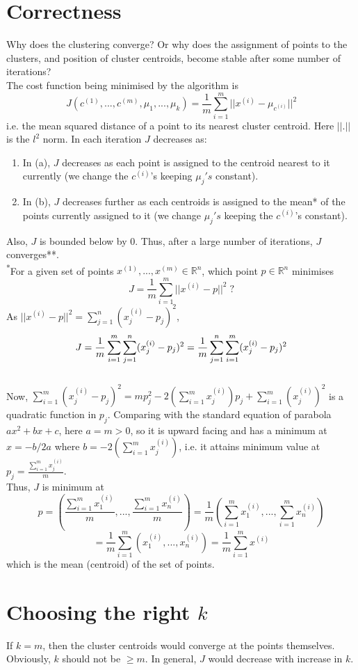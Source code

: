\documentclass{article}
\begin{document}
\section{Correctness}
Why does the clustering converge? Or why does the assignment of points to the clusters, and position of cluster centroids, become stable after some number of iterations?
\\
The cost function being minimised by the algorithm is
\[J(c^{(1)},...,c^{(m)},\mu_1,...,\mu_k) = 
\frac{1}{m}\sum_{i=1}^{m}|| x^{(i)}-\mu_{c^{(i)}}||^2\]
i.e. the mean squared distance of a point to its nearest cluster centroid. Here \(||.||\) is the \(l^2\) norm.
In each iteration \(J\) decreases as:
\begin{enumerate}
\item In (a), \(J\) decreases as each point is assigned to the centroid nearest to it currently (we change the \(c^{(i)}\)'s keeping \(\mu_j's\) constant).
\item In (b), \(J\) decreases further as each centroids is assigned to the mean* of the points currently assigned to it (we change \(\mu_j's\) keeping the \(c^{(i)}\)'s constant).
\end{enumerate}
Also, \(J\) is bounded below by 0. Thus, after a large number of iterations, \(J\) converges**.
\\
\textsuperscript{*}For a given set of points \(x^{(1)},...,x^{(m)} \in \mathbb{R}^n\), which point \(p\in\mathbb{R}^n\) minimises
\[J = \frac{1}{m}\sum_{i=1}^{m}|| x^{(i)}-p||^2\;?\]
As \(||x^{(i)}-p||^2 = \sum_{j=1}^{n}(x_j^{(i)}-p_j)^2\),
\[J = \frac{1}{m}\sum_{i=1}^{m}\sum_{j=1}^{n}(x_j^{(i)}-p_j)^2
\\
= \frac{1}{m}\sum_{j=1}^{n}\sum_{i=1}^{m}(x_j^{(i)}-p_j)^2\]
\\
Now, \(\sum_{i=1}^{m}(x_j^{(i)}-p_j)^2
=mp_j^2-2(\sum_{i=1}^{m}x_j^{(i)})p_j+
\sum_{i=1}^{m}(x_j^{(i)})^2\) is a quadratic function in \(p_j\).
Comparing with the standard equation of parabola \(ax^2+bx+c\),
here \(a=m>0\), so it is upward facing and has a minimum at \(x=-b/2a\) where \(b=-2(\sum_{i=1}^{m}x_j^{(i)})\), i.e. it attains minimum value at \(p_j=\frac{\sum_{i=1}^{m}x_j^{(i)}}{m}\).
\\
Thus, \(J\) is minimum at 
\[p=(\frac{\sum_{i=1}^{m}x_1^{(i)}}{m},...,\frac{\sum_{i=1}^{m}x_n^{(i)}}{m})
=\frac{1}{m}(\sum_{i=1}^{m}x_1^{(i)},...,\sum_{i=1}^{m}x_n^{(i)})\]
\[=\frac{1}{m}\sum_{i=1}^{m}(x_1^{(i)},...,x_n^{(i)})
=\frac{1}{m}\sum_{i=1}^{m}x^{(i)}\]
which is the mean (centroid) of the set of points.
\section{Choosing the right \(k\)}
If \(k=m\), then the cluster centroids would converge at the points themselves. Obviously, \(k\) should not be \(\geq m\).
In general, \(J\) would decrease with increase in \(k\).
\end{document}
